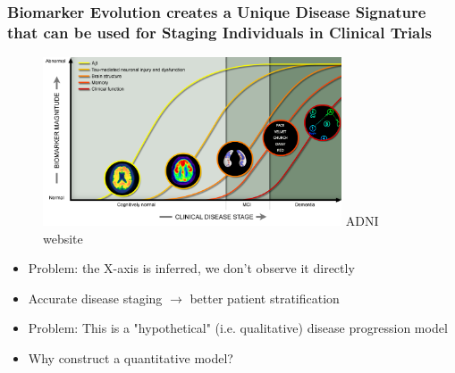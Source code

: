 \begin{frame}
\frametitle{Biomarker Evolution creates a Unique Disease Signature\\
that can be used for Staging Individuals in Clinical Trials}

\begin{figure}
\centering 
\vspace{1em}
\includegraphics[height=5cm]{adniDiseaseProgression}
\hspace{-4em}ADNI website 

\end{figure}


\begin{itemize}
 \item Problem: the X-axis is inferred, we don't observe it directly
 \item Accurate disease staging $\rightarrow$ better patient stratification
 \item Problem: This is a "hypothetical" (i.e. qualitative) disease progression model
 \item Why construct a quantitative model? 
\end{itemize}

\end{frame}





